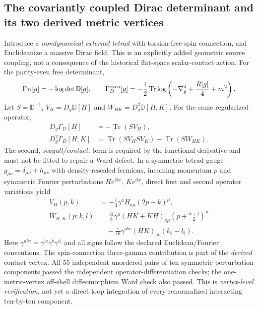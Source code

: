 \documentclass[11pt,a4paper]{article}
\begin{document}
\subsection{The covariantly coupled Dirac determinant and its two derived metric vertices}
\label{sec:qgd075-geometric-vertices}
Introduce a \emph{nondynamical external tetrad} with torsion-free spin
connection, and Euclideanize a massive Dirac field. This is an explicitly
added geometric source coupling, not a consequence of the historical
flat-space scalar-contact action. For the parity-even free determinant,
\begin{equation}\label{eq:qgd075-det}
 \Gamma_D[g]=-\log\det\mathbb D[g],\qquad
 \Gamma_D^{\rm even}[g]=-\frac12\operatorname{Tr}\log
 \left(-\nabla_g^2+\frac{R[g]}4+m^2\right).
\end{equation}
Let $S=\mathbb D^{-1}$, $V_H=D_g\mathbb D[H]$ and
$W_{HK}=D_g^2\mathbb D[H,K]$. For the same regularized operator,
\begin{equation}\label{eq:qgd075-VW-hessian}
 \boxed{\begin{aligned}
 D_g\Gamma_D[H]&=-\operatorname{Tr}(SV_H),\\
 D_g^2\Gamma_D[H,K]&=\operatorname{Tr}(SV_HSV_K)
 -\operatorname{Tr}(SW_{HK}).
 \end{aligned}}
\end{equation}
The second, \emph{seagull/contact}, term is required by the
functional derivative and must not be fitted to repair a Ward defect.
In a symmetric tetrad gauge $g_{\mu\nu}=\delta_{\mu\nu}+h_{\mu\nu}$
with density-rescaled fermions, incoming momentum $p$ and symmetric
Fourier perturbations $He^{ikx}$, $Ke^{ilx}$, direct first and second
operator variations yield
\begin{equation}\label{eq:qgd075-dirac-vertices}
 \boxed{\begin{aligned}
 V_H(p,k)&=-\frac{i}{4}\gamma^aH_{a\mu}(2p+k)^\mu,\\
 W_{H,K}(p;k,l)&=\frac{3i}{8}\gamma^a(HK+KH)_{a\mu}
 \left(p+\frac{k+l}{2}\right)^\mu\\
 &\quad-\frac{i}{16}\gamma^{abc}(HK)_{ac}(k_b-l_b).
 \end{aligned}}
\end{equation}
Here $\gamma^{abc}=\gamma^{[a}\gamma^b\gamma^{c]}$ and all signs
follow the declared Euclidean/Fourier conventions. The spin-connection
three-gamma contribution is part of the \emph{derived} contact vertex.
All 55 independent unordered pairs of ten symmetric perturbation
components passed the independent operator-differentiation checks;
the one-metric-vertex off-shell diffeomorphism Ward check also passed.
This is \emph{vertex-level verification}, not yet a direct loop integration
of every renormalized interacting ten-by-ten component.
\end{document}
